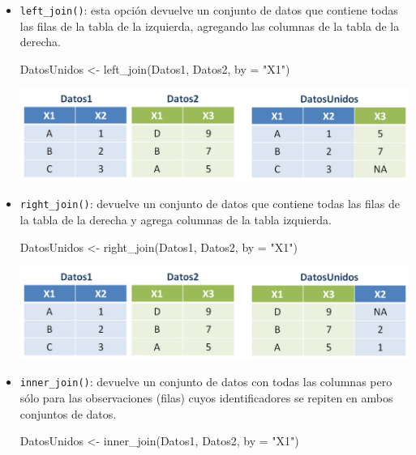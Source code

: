 \documentclass[
]{book}
\newenvironment{Shaded}{\begin{snugshade}}{\end{snugshade}}
\newcommand{\AttributeTok}[1]{\textcolor[rgb]{0.77,0.63,0.00}{#1}}
\newcommand{\FunctionTok}[1]{\textcolor[rgb]{0.00,0.00,0.00}{#1}}
\newcommand{\NormalTok}[1]{#1}
\newcommand{\OtherTok}[1]{\textcolor[rgb]{0.56,0.35,0.01}{#1}}
\newcommand{\StringTok}[1]{\textcolor[rgb]{0.31,0.60,0.02}{#1}}
\begin{document}
\begin{itemize}
\item
  \texttt{left\_join()}: esta opción devuelve un conjunto de datos que contiene todas las filas de la tabla de la izquierda, agregando las columnas de la tabla de la derecha.

\begin{Shaded}
\begin{Highlighting}[]
\NormalTok{DatosUnidos }\OtherTok{\textless{}{-}} \FunctionTok{left\_join}\NormalTok{(Datos1, Datos2, }\AttributeTok{by =} \StringTok{"X1"}\NormalTok{)}
\end{Highlighting}
\end{Shaded}

  \begin{center}\includegraphics[width=0.7\linewidth]{images/06_archivos/leftjoin} \end{center}
\item
  \texttt{right\_join()}: devuelve un conjunto de datos que contiene todas las filas de la tabla de la derecha y agrega columnas de la tabla izquierda.

\begin{Shaded}
\begin{Highlighting}[]
\NormalTok{DatosUnidos }\OtherTok{\textless{}{-}} \FunctionTok{right\_join}\NormalTok{(Datos1, Datos2, }\AttributeTok{by =} \StringTok{"X1"}\NormalTok{)}
\end{Highlighting}
\end{Shaded}

  \begin{center}\includegraphics[width=0.7\linewidth]{images/06_archivos/rightjoin} \end{center}
\item
  \texttt{inner\_join()}: devuelve un conjunto de datos con todas las columnas pero sólo para las observaciones (filas) cuyos identificadores se repiten en ambos conjuntos de datos.

\begin{Shaded}
\begin{Highlighting}[]
\NormalTok{DatosUnidos }\OtherTok{\textless{}{-}} \FunctionTok{inner\_join}\NormalTok{(Datos1, Datos2, }\AttributeTok{by =} \StringTok{"X1"}\NormalTok{)}
\end{Highlighting}
\end{Shaded}


\end{itemize}
\end{document}
